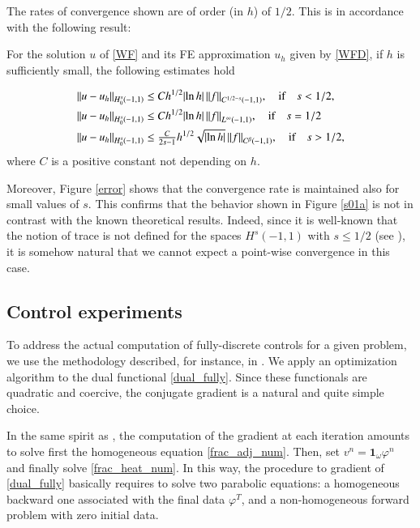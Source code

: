 The rates of convergence shown are of order (in $h$) of $1/2$. This is in accordance with the following result: 
\begin{theorem}
For the solution $u$ of \eqref{WF} and its FE approximation $u_h$ given by \eqref{WFD}, if $h$ is sufficiently small, the following estimates hold

\begin{align*}
	&{\left\|u-u_h\right\|}_{H^s_0(-1,1)}\leq C h^{1/2}|\!\ln h|\,{\left\|f\right\|}_{C^{1/2-s}(-1,1)}, \quad \textnormal{if}\quad s<1/2, 
	\\
	&{\left\|u-u_h\right\|}_{H^s_0(-1,1)}\leq C h^{1/2} |\!\ln h|\, {\left\|f\right\|}_{L^\infty(-1,1)}, \quad \textnormal{if}\quad  s=1/2 
	\\
	&{\left\|u-u_h\right\|}_{H^s_0(-1,1)}\leq \tfrac{C}{2s-1} h^{1/2} \sqrt{|\!\ln h|}\, {\left\|f\right\|}_{C^\beta(-1,1)}, \quad \textnormal{if} \quad s>1/2,
\end{align*}
where $C$ is a positive constant not depending on $h$. 
\end{theorem}

Moreover, Figure \ref{error} shows that the convergence rate is maintained also for small values of $s$. This confirms that the behavior shown in Figure \ref{s01a} is not in contrast with the known theoretical results. Indeed, since it is well-known that the notion of trace is not defined for the spaces $H^s(-1,1)$ with $s\leq 1/2$ (see \cite{jllions1972non,tartar2007introduction}), it is somehow natural that we cannot expect a point-wise convergence in this case.  

\subsection{Control experiments}\label{control_exp}

To address the actual computation of fully-discrete controls for a given problem, we use the methodology described, for instance, in \cite{glowinski2008exact}. We apply an optimization algorithm to the dual functional \eqref{dual_fully}. Since these functionals are quadratic and coercive, the conjugate gradient is a natural and quite simple choice.

In the same spirit as \cite{boyer2011uniform}, the computation of the gradient at each iteration amounts to solve first the homogeneous equation \eqref{frac_adj_num}. Then, set $v^n=\mathbf{1}_\omega\varphi^n$ and finally solve \eqref{frac_heat_num}. In this way, the procedure to gradient of \eqref{dual_fully} basically requires to solve two parabolic equations: a homogeneous backward one associated with the final data $\varphi^T$, and a non-homogeneous forward problem with zero initial data. 

